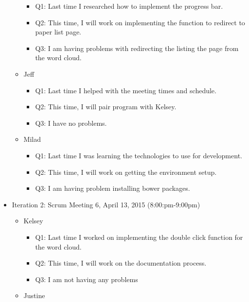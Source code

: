 \documentclass[]{article}
\begin{document}
\begin{itemize}
\begin{itemize}
    \begin{itemize}
    \itemsep1pt\parskip0pt
    \item
      Q1: Last time I researched how to implement the progress bar.
    \item
      Q2: This time, I will work on implementing the function to
      redirect to paper list page.
    \item
      Q3: I am having problems with redirecting the listing the page
      from the word cloud.
    \end{itemize}
  \item
    Jeff

    \begin{itemize}
    \itemsep1pt\parskip0pt
    \item
      Q1: Last time I helped with the meeting times and schedule.
    \item
      Q2: This time, I will pair program with Kelsey.
    \item
      Q3: I have no problems.
    \end{itemize}
  \item
    Milad

    \begin{itemize}
    \itemsep1pt\parskip0pt
    \item
      Q1: Last time I was learning the technologies to use for
      development.
    \item
      Q2: This time, I will work on getting the environment setup.
    \item
      Q3: I am having problem installing bower packages.
    \end{itemize}
  \end{itemize}
\item
  Iteration 2: Scrum Meeting 6, April 13, 2015 (8:00:pm-9:00pm)

  \begin{itemize}
  \itemsep1pt\parskip0pt
  \item
    Kelsey

    \begin{itemize}
    \itemsep1pt\parskip0pt
    \item
      Q1: Last time I worked on implementing the double click function
      for the word cloud.
    \item
      Q2: This time, I will work on the documentation process.
    \item
      Q3: I am not having any problems
    \end{itemize}
  \item
    Justine


\end{itemize}
\end{itemize}
\end{document}
